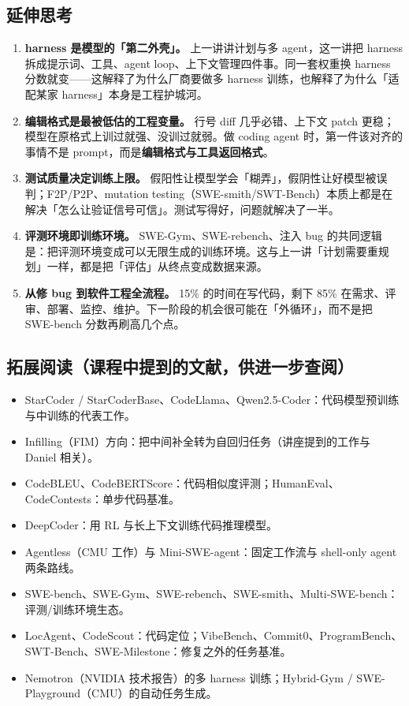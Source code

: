 ﻿\documentclass[a4paper]{article}
\begin{document}
\subsection{延伸思考}

\begin{enumerate}
\item \textbf{harness 是模型的「第二外壳」。} 上一讲讲计划与多 agent，这一讲把 harness 拆成提示词、工具、agent loop、上下文管理四件事。同一套权重换 harness 分数就变——这解释了为什么厂商要做多 harness 训练，也解释了为什么「适配某家 harness」本身是工程护城河。
\item \textbf{编辑格式是最被低估的工程变量。} 行号 diff 几乎必错、上下文 patch 更稳；模型在原格式上训过就强、没训过就弱。做 coding agent 时，第一件该对齐的事情不是 prompt，而是\textbf{编辑格式与工具返回格式}。
\item \textbf{测试质量决定训练上限。} 假阳性让模型学会「糊弄」，假阴性让好模型被误判；F2P/P2P、mutation testing（SWE-smith/SWT-Bench）本质上都是在解决「怎么让验证信号可信」。测试写得好，问题就解决了一半。
\item \textbf{评测环境即训练环境。} SWE-Gym、SWE-rebench、注入 bug 的共同逻辑是：把评测环境变成可以无限生成的训练环境。这与上一讲「计划需要重规划」一样，都是把「评估」从终点变成数据来源。
\item \textbf{从修 bug 到软件工程全流程。} 15\% 的时间在写代码，剩下 85\% 在需求、评审、部署、监控、维护。下一阶段的机会很可能在「外循环」，而不是把 SWE-bench 分数再刷高几个点。
\end{enumerate}

\subsection{拓展阅读（课程中提到的文献，供进一步查阅）}

\begin{itemize}
\item StarCoder / StarCoderBase、CodeLlama、Qwen2.5-Coder：代码模型预训练与中训练的代表工作。
\item Infilling（FIM）方向：把中间补全转为自回归任务（讲座提到的工作与 Daniel 相关）。
\item CodeBLEU、CodeBERTScore：代码相似度评测；HumanEval、CodeContests：单步代码基准。
\item DeepCoder：用 RL 与长上下文训练代码推理模型。
\item Agentless（CMU 工作）与 Mini-SWE-agent：固定工作流与 shell-only agent 两条路线。
\item SWE-bench、SWE-Gym、SWE-rebench、SWE-smith、Multi-SWE-bench：评测/训练环境生态。
\item LocAgent、CodeScout：代码定位；VibeBench、Commit0、ProgramBench、SWT-Bench、SWE-Milestone：修复之外的任务基准。
\item Nemotron（NVIDIA 技术报告）的多 harness 训练；Hybrid-Gym / SWE-Playground（CMU）的自动任务生成。
\end{itemize}
\end{document}
